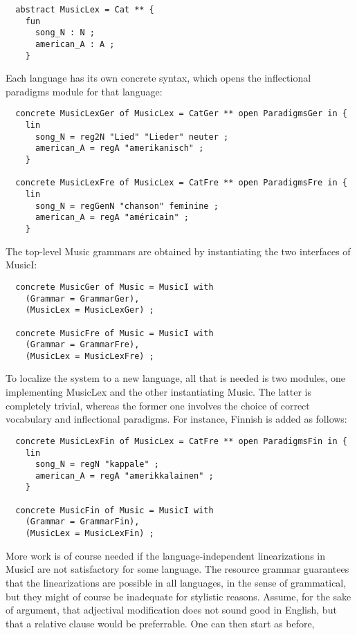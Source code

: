 \documentclass[11pt,a4paper]{article}
\begin{document}
\begin{verbatim}
  abstract MusicLex = Cat ** {
    fun
      song_N : N ;
      american_A : A ;
    }
\end{verbatim}
Each language has its own concrete syntax, which opens the inflectional paradigms
module for that language:

\begin{verbatim}
  concrete MusicLexGer of MusicLex = CatGer ** open ParadigmsGer in {
    lin
      song_N = reg2N "Lied" "Lieder" neuter ;
      american_A = regA "amerikanisch" ;
    }

  concrete MusicLexFre of MusicLex = CatFre ** open ParadigmsFre in {
    lin
      song_N = regGenN "chanson" feminine ;
      american_A = regA "américain" ;
    }
\end{verbatim}
The top-level Music grammars are obtained by instantiating the two interfaces
of MusicI:

\begin{verbatim}
  concrete MusicGer of Music = MusicI with
    (Grammar = GrammarGer),
    (MusicLex = MusicLexGer) ;

  concrete MusicFre of Music = MusicI with
    (Grammar = GrammarFre),
    (MusicLex = MusicLexFre) ;
\end{verbatim}
To localize the system to a new language, all that is needed is two modules,
one implementing MusicLex and the other instantiating Music. The latter is
completely trivial, whereas the former one involves the choice of correct
vocabulary and inflectional paradigms. For instance, Finnish is added as follows:

\begin{verbatim}
  concrete MusicLexFin of MusicLex = CatFre ** open ParadigmsFin in {
    lin
      song_N = regN "kappale" ;
      american_A = regA "amerikkalainen" ;
    }

  concrete MusicFin of Music = MusicI with
    (Grammar = GrammarFin),
    (MusicLex = MusicLexFin) ;
\end{verbatim}
More work is of course needed if the language-independent linearizations in
MusicI are not satisfactory for some language. The resource grammar guarantees
that the linearizations are possible in all languages, in the sense of grammatical,
but they might of course be inadequate for stylistic reasons. Assume, 
for the sake of argument, that adjectival modification does not sound good in
English, but that a relative clause would be preferrable. One can then start as
before,
\end{document}
